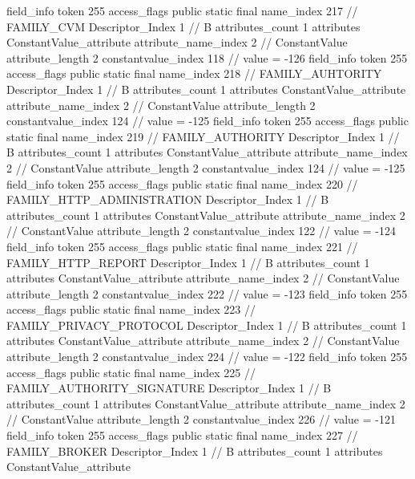 {{{{{{{				}
				}
			}
			field_info {
				token	255
				access_flags	public static final
				name_index	217		// FAMILY_CVM
				Descriptor_Index	1		// B
				attributes_count	1
				attributes {
				ConstantValue_attribute {
					attribute_name_index	2		// ConstantValue
					attribute_length	2
					constantvalue_index	118		// value = -126
				}
				}
			}
			field_info {
				token	255
				access_flags	public static final
				name_index	218		// FAMILY_AUHTORITY
				Descriptor_Index	1		// B
				attributes_count	1
				attributes {
				ConstantValue_attribute {
					attribute_name_index	2		// ConstantValue
					attribute_length	2
					constantvalue_index	124		// value = -125
				}
				}
			}
			field_info {
				token	255
				access_flags	public static final
				name_index	219		// FAMILY_AUTHORITY
				Descriptor_Index	1		// B
				attributes_count	1
				attributes {
				ConstantValue_attribute {
					attribute_name_index	2		// ConstantValue
					attribute_length	2
					constantvalue_index	124		// value = -125
				}
				}
			}
			field_info {
				token	255
				access_flags	public static final
				name_index	220		// FAMILY_HTTP_ADMINISTRATION
				Descriptor_Index	1		// B
				attributes_count	1
				attributes {
				ConstantValue_attribute {
					attribute_name_index	2		// ConstantValue
					attribute_length	2
					constantvalue_index	122		// value = -124
				}
				}
			}
			field_info {
				token	255
				access_flags	public static final
				name_index	221		// FAMILY_HTTP_REPORT
				Descriptor_Index	1		// B
				attributes_count	1
				attributes {
				ConstantValue_attribute {
					attribute_name_index	2		// ConstantValue
					attribute_length	2
					constantvalue_index	222		// value = -123
				}
				}
			}
			field_info {
				token	255
				access_flags	public static final
				name_index	223		// FAMILY_PRIVACY_PROTOCOL
				Descriptor_Index	1		// B
				attributes_count	1
				attributes {
				ConstantValue_attribute {
					attribute_name_index	2		// ConstantValue
					attribute_length	2
					constantvalue_index	224		// value = -122
				}
				}
			}
			field_info {
				token	255
				access_flags	public static final
				name_index	225		// FAMILY_AUTHORITY_SIGNATURE
				Descriptor_Index	1		// B
				attributes_count	1
				attributes {
				ConstantValue_attribute {
					attribute_name_index	2		// ConstantValue
					attribute_length	2
					constantvalue_index	226		// value = -121
				}
				}
			}
			field_info {
				token	255
				access_flags	public static final
				name_index	227		// FAMILY_BROKER
				Descriptor_Index	1		// B
				attributes_count	1
				attributes {
				ConstantValue_attribute {
}}}}}}}
